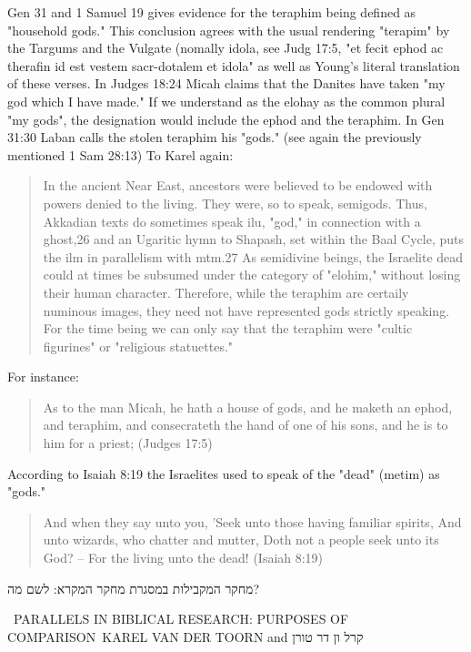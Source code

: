 \documentclass[11pt]{article}
\begin{document}
{Gen 31 and 1 Samuel 19 gives evidence for the teraphim being defined as "household gods." This conclusion agrees with the usual rendering "terapim" by the Targums and the Vulgate (nomally idola, see Judg 17:5, "et fecit ephod ac therafin id est vestem sacr-dotalem et idola" as well as Young's literal translation of these verses. In Judges 18:24 Micah claims that the Danites have taken "my god which I have made." If we understand as the elohay as the common plural "my gods", the designation would include the ephod and the teraphim. In Gen 31:30 Laban calls the stolen teraphim his "gods." (see again the previously mentioned 1 Sam 28:13) To Karel again:
\begin{quote}
In the ancient Near East, ancestors were believed to be endowed with powers denied to the living. They were, so to speak, semigods. Thus, Akkadian texts do sometimes speak ilu, "god," in connection with a ghost,26 and an Ugaritic hymn to Shapash, set within the Baal Cycle, puts the ilm in parallelism with mtm.27 As semidivine beings, the Israelite dead could at times be subsumed under the category of "elohim," without losing their human character. Therefore, while the teraphim are certaily numinous images, they need not have represented gods strictly speaking. For the time being we can only say that the teraphim were "cultic figurines" or "religious statuettes."
\end{quote}

For instance:
\begin{quote}
As to the man Micah, he hath a house of gods, and he maketh an ephod, and teraphim, and consecrateth the hand of one of his sons, and he is to him for a priest; (Judges 17:5)
\end{quote}

According to Isaiah 8:19 the Israelites used to speak of the "dead" (metim) as "gods."
\begin{quote}
And when they say unto you, 'Seek unto those having familiar spirits, And unto wizards, who chatter and mutter, Doth not a people seek unto its God? -- For the living unto the dead! (Isaiah 8:19)
\end{quote}



\begin{hebrew}
מחקר המקבילות במסגרת מחקר המקרא: לשם מה?    
\end{hebrew}
 \ PARALLELS IN BIBLICAL RESEARCH: PURPOSES OF COMPARISON\
KAREL VAN DER TOORN and קרל ון דר טורן

}
\end{document}
